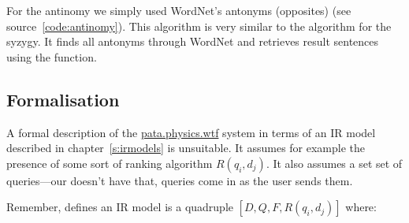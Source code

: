For the antinomy we simply used WordNet's antonyms (opposites) (see source~\ref{code:antinomy}). This algorithm is very similar to the algorithm for the syzygy. It finds all antonyms through WordNet and retrieves result sentences using the  function.


\subsection{Formalisation}

A formal description of the \url{pata.physics.wtf} system in terms of an \ac{IR} model described in chapter~\ref{s:irmodels} is unsuitable. It assumes for example the presence of some sort of ranking algorithm $R(q_i, d_j)$. It also assumes a set set of queries---our doesn't have that, queries come in as the user sends them.

Remember, \autocite{Yates2011} defines an \ac{IR} model is a quadruple $[D,Q,F,R(q_i, d_j)]$ where:\\
 \\
 \\
 \\
            \\
 \\
 

